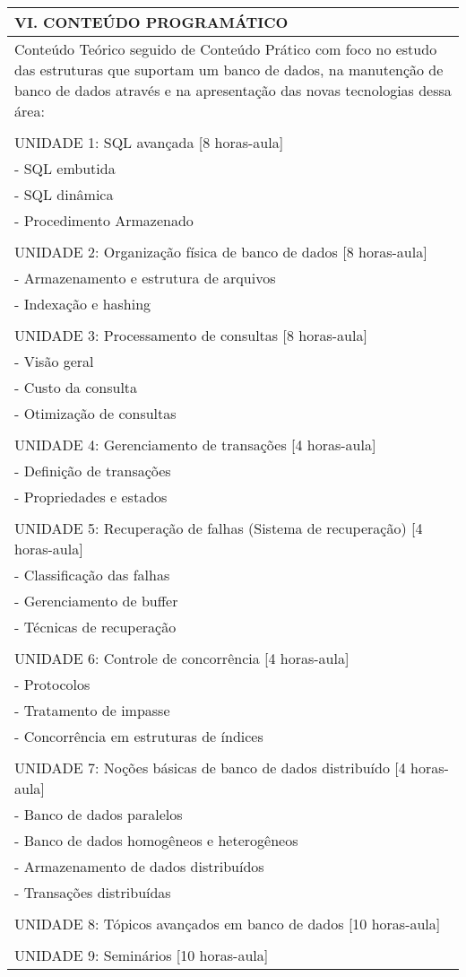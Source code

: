 \documentclass[12pt]{article}
\begin{document}
\begin{longtable}{|L{1.025\textwidth}|} \hline
%
{\bf VI. CONTEÚDO PROGRAMÁTICO } \\ \hline
Conteúdo Teórico seguido de Conteúdo Prático com foco no estudo das estruturas que suportam um banco de dados, na manutenção de banco de dados através e na apresentação das novas tecnologias dessa área: \\
\\
UNIDADE 1: SQL avançada [8 horas-aula] \\
- SQL embutida\\
- SQL dinâmica\\
- Procedimento Armazenado\\
\\
UNIDADE 2: Organização física de banco de dados [8 horas-aula] \\
- Armazenamento e estrutura de arquivos\\
- Indexação e hashing\\
\\
UNIDADE 3: Processamento de consultas [8 horas-aula]\\
- Visão geral\\
- Custo da consulta \\
- Otimização de consultas\\
\\
UNIDADE 4: Gerenciamento de transações [4 horas-aula]\\
- Definição de transações\\
- Propriedades e estados\\
\\
UNIDADE 5: Recuperação de falhas (Sistema de recuperação) [4 horas-aula] \\
- Classificação das falhas\\
- Gerenciamento de buffer\\
- Técnicas de recuperação\\
\\
UNIDADE 6: Controle de concorrência [4 horas-aula] \\
- Protocolos\\
- Tratamento de impasse\\
- Concorrência em estruturas de índices\\
\\
UNIDADE 7: Noções básicas de banco de dados distribuído [4 horas-aula]\\
- Banco de dados paralelos\\
- Banco de dados homogêneos e heterogêneos\\
- Armazenamento de dados distribuídos\\
- Transações distribuídas\\
\\
UNIDADE 8: Tópicos avançados em banco de dados [10 horas-aula]\\
\\
UNIDADE 9: Seminários [10 horas-aula]
\\ \hline
\end{longtable} 
\end{document}
